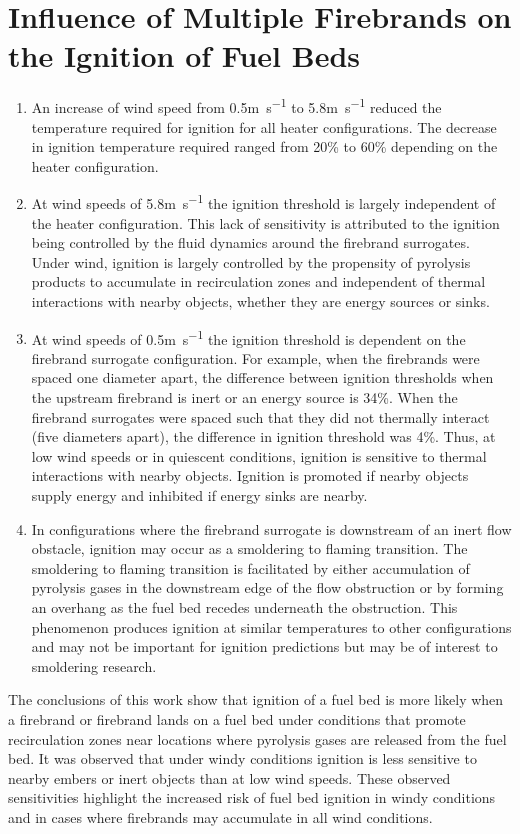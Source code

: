 \section{Influence of Multiple Firebrands on the Ignition of Fuel Beds}
        \begin{enumerate}
            \item An increase of wind speed from 0.5\si{\meter\per\second} to 5.8\si{\meter\per\second} reduced the temperature required for ignition for all heater configurations. The decrease in ignition temperature required ranged from 20\% to 60\% depending on the heater configuration. 
            
            \item At wind speeds of 5.8\si{\meter\per\second} the ignition threshold is largely independent of the heater configuration. This lack of sensitivity is attributed to the ignition being controlled by the fluid dynamics around the firebrand surrogates. Under wind, ignition is largely controlled by the propensity of pyrolysis products to accumulate in recirculation zones and independent of thermal interactions with nearby objects, whether they are energy sources or sinks. 
            \item At wind speeds of 0.5\si{\meter\per\second} the ignition threshold is dependent on the firebrand surrogate configuration. For example, when the firebrands were spaced one diameter apart, the difference between ignition thresholds when the upstream firebrand is inert or an energy source is 34\%. When the firebrand surrogates were spaced such that they did not thermally interact (five diameters apart), the difference in ignition threshold was 4\%. Thus, at low wind speeds or in quiescent conditions, ignition is sensitive to thermal interactions with nearby objects. Ignition is promoted if nearby objects supply energy and inhibited if energy sinks are nearby. 
            
            \item In configurations where the firebrand surrogate is downstream of an inert flow obstacle, ignition may occur as a smoldering to flaming transition. The smoldering to flaming transition is facilitated by either accumulation of pyrolysis gases in the downstream edge of the flow obstruction or by forming an overhang as the fuel bed recedes underneath the obstruction. This phenomenon produces ignition at similar temperatures to other configurations and may not be important for ignition predictions but may be of interest to smoldering research. 
        \end{enumerate}
    The conclusions of this work show that ignition of a fuel bed is more likely when a firebrand or firebrand lands on a fuel bed under conditions that promote recirculation zones near locations where pyrolysis gases are released from the fuel bed. It was observed that under windy conditions ignition is less sensitive to nearby embers or inert objects than at low wind speeds. These observed sensitivities highlight the increased risk of fuel bed ignition in windy conditions and in cases where firebrands may accumulate in all wind conditions. 

